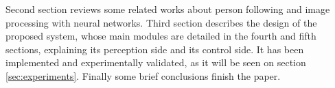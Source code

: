 


Second section reviews some related works about person following and image processing with neural networks. Third section describes the design of the proposed system, whose main modules are detailed in the fourth and fifth sections, explaining its perception side and its control side. It has been implemented and experimentally validated, as it will be seen on section \ref{sec:experiments}. Finally some brief conclusions finish the paper.